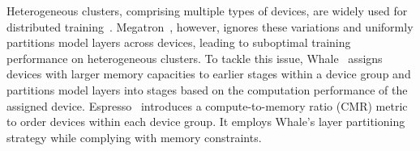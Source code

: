 \documentclass[conference]{IEEEtran}
\begin{document}
Heterogeneous clusters, comprising multiple types of devices, are widely used for distributed training~\cite{Lai2023, yun2025jabas, zhouespresso}.
Megatron~\cite{shoeybi2019megatron}, however, ignores these variations and uniformly partitions model layers across devices, leading to suboptimal training performance on heterogeneous clusters.
To tackle this issue, Whale~\cite{jia2022whale} assigns devices with larger memory capacities to earlier stages within a device group and partitions model layers into stages based on the computation performance of the assigned device.
Espresso~\cite{zhouespresso} introduces a compute-to-memory ratio (CMR) metric to order devices within each device group.
It employs Whale’s layer partitioning strategy while complying with memory constraints.
\end{document}
